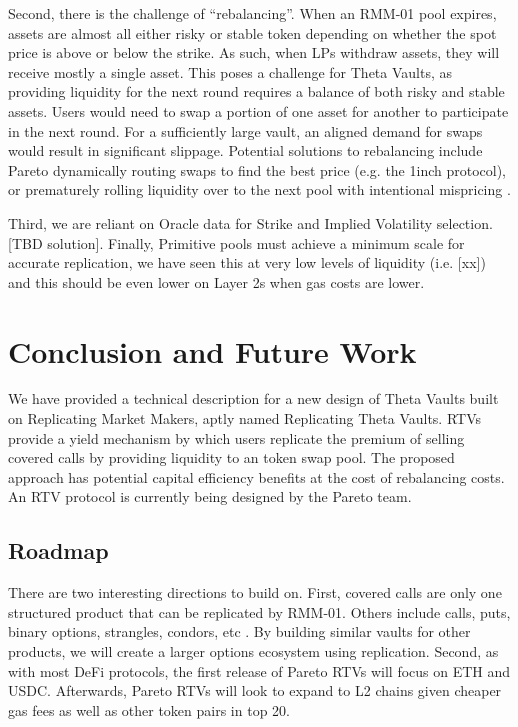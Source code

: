 \documentclass[hidelinks, 12pt]{article}
\begin{document}
Second, there is the challenge of ``rebalancing''. When an RMM-01 pool expires, assets are almost all either risky or stable token depending on whether the spot price is above or below the strike. As such, when LPs withdraw assets, they will receive mostly a single asset. This poses a challenge for Theta Vaults, as providing liquidity for the next round requires a balance of both risky and stable assets. Users would need to swap a portion of one asset for another to participate in the next round. For a sufficiently large vault, an aligned demand for swaps would result in significant slippage. Potential solutions to rebalancing include Pareto dynamically routing swaps to find the best price (e.g. the 1inch protocol), or prematurely rolling liquidity over to the next pool with intentional mispricing \cite{sterrett2022replicating}.

Third, we are reliant on Oracle data for Strike and Implied Volatility selection. [TBD solution]. Finally, Primitive pools must achieve a minimum scale for accurate replication, we have seen this at very low levels of liquidity (i.e. [xx]) and this should be even lower on Layer 2s when gas costs are lower.

\section{Conclusion and Future Work}

We have provided a technical description for a new design of Theta Vaults built on Replicating Market Makers, aptly named Replicating Theta Vaults. RTVs provide a yield mechanism by which users replicate the premium of selling covered calls by providing liquidity to an token swap pool. The proposed approach has potential capital efficiency benefits at the cost of rebalancing costs.
An RTV protocol is currently being designed by the Pareto team.

\subsection{Roadmap}

There are two interesting directions to build on. First, covered calls are only one structured product that can be replicated by RMM-01. Others include calls, puts, binary options, strangles, condors, etc \cite{sterrett2022replicating}. By building similar vaults for other products, we will create a larger options ecosystem using replication. Second, as with most DeFi protocols, the first release of Pareto RTVs will focus on ETH and USDC. Afterwards, Pareto RTVs will look to expand to L2 chains given cheaper gas fees as well as other token pairs in top 20.



\end{document}
